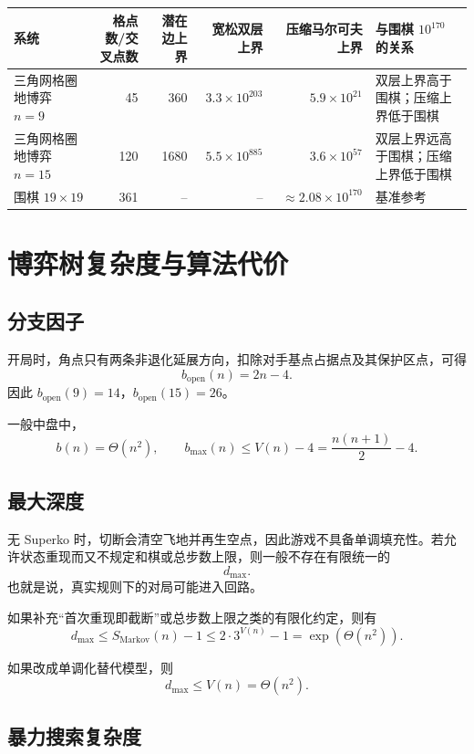 \documentclass[12pt]{ctexart}
\begin{document}
\begin{center}
\begin{tabular}{lrrrrl}
\toprule
系统 & 格点数/交叉点数 & 潜在边上界 & 宽松双层上界 & 压缩马尔可夫上界 & 与围棋 \(10^{170}\) 的关系 \\
\midrule
三角网格圈地博弈 \(n=9\)  & 45  & 360  & \(3.3\times 10^{203}\) & \(5.9\times 10^{21}\) & 双层上界高于围棋；压缩上界低于围棋 \\
三角网格圈地博弈 \(n=15\) & 120 & 1680 & \(5.5\times 10^{885}\) & \(3.6\times 10^{57}\) & 双层上界远高于围棋；压缩上界低于围棋 \\
围棋 \(19\times 19\) & 361 & -- & -- & \(\approx 2.08\times 10^{170}\) & 基准参考 \\
\bottomrule
\end{tabular}
\end{center}

\section*{博弈树复杂度与算法代价}

\subsection*{分支因子}

开局时，角点只有两条非退化延展方向，扣除对手基点占据点及其保护区点，可得
\[
b_{\mathrm{open}}(n)=2n-4.
\]
因此 \(b_{\mathrm{open}}(9)=14\)，\(b_{\mathrm{open}}(15)=26\)。

一般中盘中，
\[
b(n)=\Theta(n^2),
\qquad
b_{\max}(n)\le V(n)-4=\frac{n(n+1)}2-4.
\]

\subsection*{最大深度}

无 Superko 时，切断会清空飞地并再生空点，因此游戏不具备单调填充性。若允许状态重现而又不规定和棋或总步数上限，则一般不存在有限统一的
\[
d_{\max}.
\]
也就是说，真实规则下的对局可能进入回路。

如果补充“首次重现即截断”或总步数上限之类的有限化约定，则有
\[
d_{\max}\le S_{\mathrm{Markov}}(n)-1\le 2\cdot 3^{V(n)}-1=\exp(\Theta(n^2)).
\]

如果改成单调化替代模型，则
\[
d_{\max}\le V(n)=\Theta(n^2).
\]

\subsection*{暴力搜索复杂度}
\end{document}
